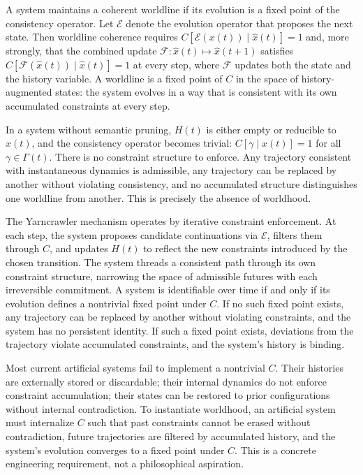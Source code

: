 \documentclass[11pt]{article}
\theoremstyle{definition}
\theoremstyle{remark}
\begin{document}
A system maintains a coherent worldline if its evolution is a fixed point of the consistency
operator. Let $\mathcal{E}$ denote the evolution operator that proposes the next state. Then
worldline coherence requires $C[\mathcal{E}(x(t)) \mid \hat{x}(t)] = 1$ and, more strongly,
that the combined update $\mathcal{F}: \hat{x}(t) \mapsto \hat{x}(t+1)$ satisfies
$C[\mathcal{F}(\hat{x}(t)) \mid \hat{x}(t)] = 1$ at every step, where $\mathcal{F}$ updates
both the state and the history variable. A worldline is a fixed point of $C$ in the space
of history-augmented states: the system evolves in a way that is consistent with its own
accumulated constraints at every step.

In a system without semantic pruning, $H(t)$ is either empty or reducible to $x(t)$, and
the consistency operator becomes trivial: $C[\gamma \mid x(t)] = 1$ for all $\gamma \in
\Gamma(t)$. There is no constraint structure to enforce. Any trajectory consistent with
instantaneous dynamics is admissible, any trajectory can be replaced by another without
violating consistency, and no accumulated structure distinguishes one worldline from another.
This is precisely the absence of worldhood.

The Yarncrawler mechanism operates by iterative constraint enforcement. At each step, the
system proposes candidate continuations via $\mathcal{E}$, filters them through $C$, and
updates $H(t)$ to reflect the new constraints introduced by the chosen transition. The
system threads a consistent path through its own constraint structure, narrowing the space
of admissible futures with each irreversible commitment. A system is identifiable over time
if and only if its evolution defines a nontrivial fixed point under $C$. If no such fixed
point exists, any trajectory can be replaced by another without violating constraints, and
the system has no persistent identity. If such a fixed point exists, deviations from the
trajectory violate accumulated constraints, and the system's history is binding.

Most current artificial systems fail to implement a nontrivial $C$. Their histories are
externally stored or discardable; their internal dynamics do not enforce constraint
accumulation; their states can be restored to prior configurations without internal
contradiction. To instantiate worldhood, an artificial system must internalize $C$ such
that past constraints cannot be erased without contradiction, future trajectories are
filtered by accumulated history, and the system's evolution converges to a fixed point
under $C$. This is a concrete engineering requirement, not a philosophical aspiration.
\end{document}
